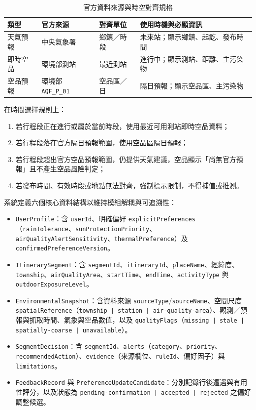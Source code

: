 \documentclass[conference]{IEEEtran}
\begin{document}
\begin{table}[t]
  \centering
  \caption{官方資料來源與時空對齊規格}
  \label{tab:data_sources}
  \begin{tabularx}{\columnwidth}{@{}l l l X@{}}
    \toprule
    \textbf{類型} & \textbf{官方來源} & \textbf{對齊單位} & \textbf{使用時機與必顯資訊} \\
    \midrule
    天氣預報 & 中央氣象署 & 鄉鎮／時段 & 未來站；顯示鄉鎮、起訖、發布時間 \\
    即時空品 & 環境部測站 & 最近測站 & 進行中；顯示測站、距離、主污染物 \\
    空品預報 & 環境部 \texttt{AQF\_P\_01} & 空品區／日 & 隔日預報；顯示空品區、主污染物 \\
    \bottomrule
  \end{tabularx}
\end{table}

在時間選擇規則上：
\begin{enumerate}
  \item 若行程段正在進行或屬於當前時段，使用最近可用測站即時空品資料；
  \item 若行程段落在官方隔日預報範圍，使用空品區隔日預報；
  \item 若行程段超出官方空品預報範圍，仍提供天氣建議，空品顯示「尚無官方預報」且不產生空品風險判定；
  \item 若發布時間、有效時段或地點無法對齊，強制標示限制，不得補值或推測。
\end{enumerate}

系統定義六個核心資料結構以維持模組解耦與可追溯性：
\begin{itemize}
  \item \texttt{UserProfile}：含 \texttt{userId}、明確偏好 \texttt{explicitPreferences}（\texttt{rainTolerance}、\texttt{sunProtectionPriority}、\texttt{airQualityAlertSensitivity}、\texttt{thermalPreference}）及 \texttt{confirmedPreferenceVersion}。
  \item \texttt{ItinerarySegment}：含 \texttt{segmentId}、\texttt{itineraryId}、\texttt{placeName}、經緯度、\texttt{township}、\texttt{airQualityArea}、\texttt{startTime}、\texttt{endTime}、\texttt{activityType} 與 \texttt{outdoorExposureLevel}。
  \item \texttt{EnvironmentalSnapshot}：含資料來源 \texttt{sourceType}/\texttt{sourceName}、空間尺度 \texttt{spatialReference}（\texttt{township | station | air-quality-area}）、觀測／預報與抓取時間、氣象與空品數值，以及 \texttt{qualityFlags}（\texttt{missing | stale | spatially-coarse | unavailable}）。
  \item \texttt{SegmentDecision}：含 \texttt{segmentId}、\texttt{alerts}（\texttt{category}、\texttt{priority}、\texttt{recommendedAction}）、\texttt{evidence}（來源欄位、\texttt{ruleId}、偏好因子）與 \texttt{limitations}。
  \item \texttt{FeedbackRecord} 與 \texttt{PreferenceUpdateCandidate}：分別記錄行後遭遇與有用性評分，以及狀態為 \texttt{pending-confirmation | accepted | rejected} 之偏好調整候選。
\end{itemize}
\end{document}
